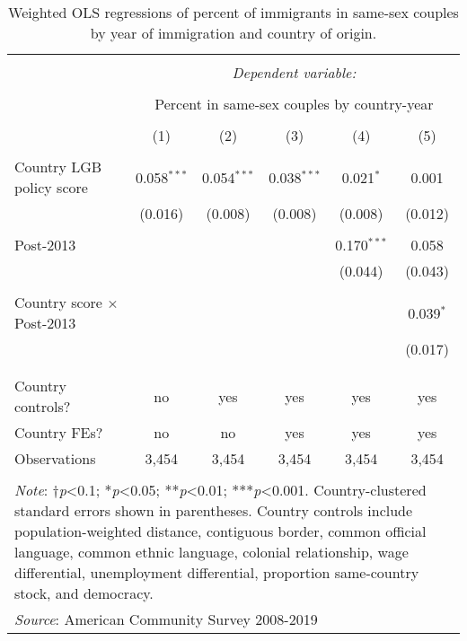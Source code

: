 \documentclass[
  11pt,
]{article}
\begin{document}
\begin{table}[H] \centering 
  \caption{Weighted OLS regressions of percent of immigrants in same-sex couples by year of immigration and country of origin.} 
  \label{tab:country-props} 
\begin{tabular}{@{\extracolsep{5pt}}lccccc} 
\\[-1.8ex]\hline 
\hline \\[-1.8ex] 
 & \multicolumn{5}{c}{\textit{Dependent variable:}} \\ 
\cline{2-6} 
\\[-1.8ex] & \multicolumn{5}{c}{Percent in same-sex couples by country-year} \\ 
\\[-1.8ex] & (1) & (2) & (3) & (4) & (5)\\ 
\hline \\[-1.8ex] 
 Country LGB policy score & 0.058$^{***}$ & 0.054$^{***}$ & 0.038$^{***}$ & 0.021$^{*}$ & 0.001 \\ 
  & (0.016) & (0.008) & (0.008) & (0.008) & (0.012) \\ 
  & & & & & \\ 
 Post-2013 &  &  &  & 0.170$^{***}$ & 0.058 \\ 
  &  &  &  & (0.044) & (0.043) \\ 
  & & & & & \\ 
 Country score × Post-2013 &  &  &  &  & 0.039$^{*}$ \\ 
  &  &  &  &  & (0.017) \\ 
  & & & & & \\ 
\hline \\[-1.8ex] 
Country controls? & no & yes & yes & yes & yes \\ 
Country FEs? & no & no & yes & yes & yes \\ 
Observations & 3,454 & 3,454 & 3,454 & 3,454 & 3,454 \\ 
\hline 
\hline \\[-1.8ex] 
\multicolumn{6}{l}{\parbox[t]{.8\textwidth}{\textit{Note}: †\textit{p}<0.1; *\textit{p}<0.05; **\textit{p}<0.01; ***\textit{p}<0.001. Country-clustered standard errors shown in parentheses. Country controls include population-weighted distance, contiguous border, common official language, common ethnic language, colonial relationship, wage differential, unemployment differential, proportion same-country stock, and democracy.}} \\ 
\multicolumn{6}{l}{\textit{Source}: American Community Survey 2008-2019} \\ 
\end{tabular} 
\end{table}
\end{document}

